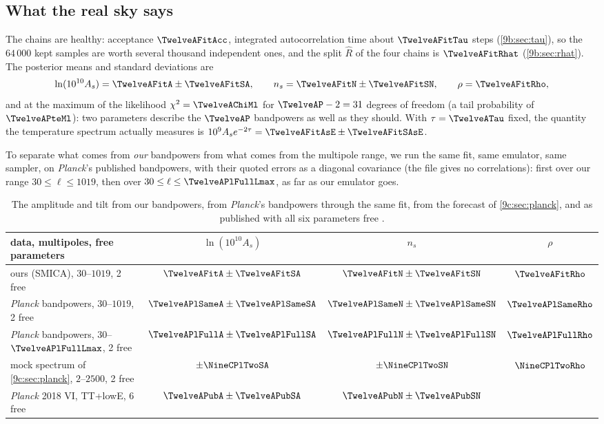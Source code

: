 \subsection{What the real sky says}
\label{13a:sec:fit-results}

The chains are healthy: acceptance $\TwelveAFitAcc$, integrated autocorrelation time about $\TwelveAFitTau$ steps
(\cref{9b:sec:tau}), so the $64\,000$ kept samples are worth several thousand independent ones, and the split $\hat R$ of the
four chains is $\TwelveAFitRhat$ (\cref{9b:sec:rhat}). The posterior means and standard deviations are
\begin{equation}
  \ln(10^{10}A_s)=\TwelveAFitA\pm\TwelveAFitSA,\qquad n_s=\TwelveAFitN\pm\TwelveAFitSN,\qquad\rho=\TwelveAFitRho ,
  \label{13a:eq:fit}
\end{equation}
and at the maximum of the likelihood $\chi^2=\TwelveAChiMl$ for $\TwelveAP-2=31$ degrees of freedom (a tail probability of
$\TwelveAPteMl$): two parameters describe the $\TwelveAP$ bandpowers as well as they should. With $\tau=\TwelveATau$ fixed, the
quantity the temperature spectrum actually measures is $10^9A_se^{-2\tau}=\TwelveAFitAsE\pm\TwelveAFitSAsE$.

To separate what comes from \emph{our} bandpowers from what comes from the multipole range, we run the same fit, same emulator,
same sampler, on \textit{Planck}'s published bandpowers, with their quoted errors as a diagonal covariance (the file gives no
correlations): first over our range $30\le\ell\le1019$, then over $30\le\ell\le\TwelveAPlFullLmax$, as far as our emulator goes.

\begin{table}[htbp]
\centering\small
\begin{tabular}{@{}lccc@{}}
\toprule
data, multipoles, free parameters & $\ln(10^{10}A_s)$ & $n_s$ & $\rho$\\
\midrule
ours (SMICA), $30$--$1019$, 2 free & $\TwelveAFitA\pm\TwelveAFitSA$ & $\TwelveAFitN\pm\TwelveAFitSN$ & $\TwelveAFitRho$\\
\textit{Planck} bandpowers, $30$--$1019$, 2 free & $\TwelveAPlSameA\pm\TwelveAPlSameSA$ & $\TwelveAPlSameN\pm\TwelveAPlSameSN$ & $\TwelveAPlSameRho$\\
\textit{Planck} bandpowers, $30$--$\TwelveAPlFullLmax$, 2 free & $\TwelveAPlFullA\pm\TwelveAPlFullSA$ & $\TwelveAPlFullN\pm\TwelveAPlFullSN$ & $\TwelveAPlFullRho$\\
mock spectrum of \cref{9c:sec:planck}, $2$--$2500$, 2 free & $\pm\NineCPlTwoSA$ & $\pm\NineCPlTwoSN$ & $\NineCPlTwoRho$\\
\textit{Planck} 2018 VI, TT+lowE, 6 free & $\TwelveAPubA\pm\TwelveAPubSA$ & $\TwelveAPubN\pm\TwelveAPubSN$ & \\
\bottomrule
\end{tabular}
\caption{The amplitude and tilt from our bandpowers, from \textit{Planck}'s bandpowers through the same fit, from the
forecast of \cref{9c:sec:planck}, and as published with all six parameters free \cite{Planck2018VI}.}
\label{13a:tab:fit}
\end{table}

